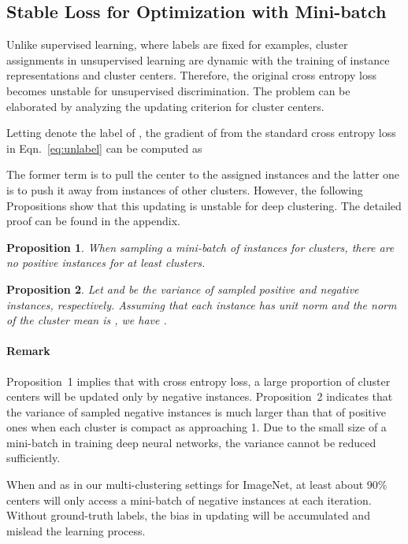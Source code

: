 \documentclass[10pt,twocolumn,letterpaper]{article}
\newtheorem{prop}{Proposition}
\begin{document}
\subsection{Stable Loss for Optimization with Mini-batch}
Unlike supervised learning, where labels are fixed for examples, cluster assignments  in unsupervised learning are dynamic with the training of instance representations and cluster centers. Therefore, the original cross entropy loss becomes unstable for unsupervised discrimination. The problem can be elaborated by analyzing the updating criterion for cluster centers.

Letting  denote the label of , the gradient of  from the standard cross entropy loss in Eqn.~\ref{eq:unlabel} can be computed as

The former term is to pull the center  to the assigned instances and the latter one is to push it away from instances of other clusters. However, the following Propositions show that this updating is unstable for deep clustering. The detailed proof can be found in the appendix.

\begin{prop}\label{prop:1}
When sampling a mini-batch of  instances for  clusters, there are no positive instances for at least  clusters.
\end{prop}

\begin{prop} \label{prop:2}
Let  and  be the variance of sampled positive and negative instances, respectively. Assuming that each instance has unit norm and the norm of the cluster mean is , we have
.
\end{prop} 


\paragraph{Remark} Proposition~1 implies that with cross entropy loss, a large proportion of cluster centers will be updated only by negative instances. Proposition~2 indicates that the variance of sampled negative instances is much larger than that of positive ones when each cluster is compact as  approaching 1. Due to the small size of a mini-batch in training deep neural networks, the variance cannot be reduced sufficiently. 

When  and  as in our multi-clustering settings for ImageNet, at least about 90\% centers will only access a mini-batch of negative instances at each iteration. Without ground-truth labels, the bias in updating will be accumulated and mislead the learning process.
\end{document}
